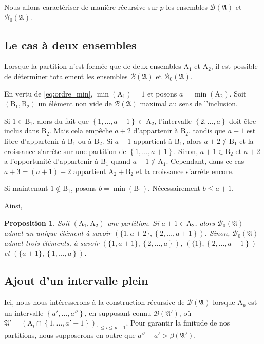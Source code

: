 \documentclass[11pt, oneside]{article}   	%
\newcommand{\interval}[2]{\left\{ #1, \dots, #2 \right\}}
\newtheorem{proposition}{Proposition}
\begin{document}
Nous allons caractériser de manière récursive sur $p$ les ensembles $\mathcal{B}(\mathfrak{A})$ et $\mathcal{B}_0(\mathfrak{A})$.

\subsection{Le cas à deux ensembles}

Lorsque la partition n'est formée que de deux ensembles $\mathrm{A}_1$ et $\mathrm{A}_2$,
il est possible de déterminer totalement les ensembles $\mathcal{B}(\mathfrak{A})$ et $\mathcal{B}_0(\mathfrak{A})$.

En vertu de \eqref{eq:ordre_min}, $\min(\mathrm{A}_1) = 1$ et posons $a = \min(\mathrm{A}_2)$.
Soit $(\mathrm{B}_1, \mathrm{B}_2)$ un élément non vide de $\mathcal{B}(\mathfrak{A})$ maximal au sens de l'inclusion.

Si $1 \in \mathrm{B}_1$, alors du fait que $\interval{1}{a-1} \subset \mathrm{A}_2$, l'intervalle $\interval{2}{a}$ doit être inclus dans $\mathrm{B}_2$.
Mais cela empêche $a+2$ d'appartenir à $\mathrm{B}_2$, tandis que $a+1$ est libre d'appartenir à $\mathrm{B}_1$ ou à $\mathrm{B}_2$.
Si $a+1$ appartient à $\mathrm{B}_1$, alors $a+2 \notin \mathrm{B}_1$ et la croissance s'arrête sur une partition de $\interval{1}{a+1}$.
Sinon, $a + 1 \in \mathrm{B}_2$ et $a+2$ a l'opportunité d'appartenir à $\mathrm{B}_1$ quand $a + 1 \notin \mathrm{A}_1$.
Cependant, dans ce cas $a + 3 = (a + 1) + 2$ appartient $\mathrm{A}_2 + \mathrm{B}_2$ et la croissance s'arrête encore.

Si maintenant $1 \notin \mathrm{B}_1$, posons $b = \min(\mathrm{B}_1)$.
Nécessairement $b \leqslant a + 1$.

Ainsi,
\begin{proposition}
Soit $(\mathrm{A}_1, \mathrm{A}_2)$ une partition.
Si $a + 1 \in \mathrm{A}_2$, alors $\mathcal{B}_0(\mathfrak{A})$ admet un unique élément à savoir $(\{1, a+2\}, \interval{2}{a+1})$.
Sinon, $\mathcal{B}_0(\mathfrak{A})$ admet trois éléments, à savoir $(\{1, a+1\}, \interval{2}{a})$, $(\{1\}, \interval{2}{a+1})$ et $(\{a + 1\}, \interval{1}{a})$.
\end{proposition}

\subsection{Ajout d'un intervalle plein}

Ici, nous nous intéresserons à la construction récursive de $\mathcal{B}(\mathfrak{A})$ lorsque $\mathrm{A}_p$ est un intervalle $\interval{a'}{a''}$,
en supposant connu $\mathcal{B}(\mathfrak{A}')$, où $\mathfrak{A}' = (\mathrm{A}_i \cap \interval{1}{a'-1})_{1 \leqslant i \leqslant p-1}$.
Pour garantir la finitude de nos partitions, nous supposerons en outre que $a'' - a' > \beta(\mathfrak{A}')$.
\end{document}
